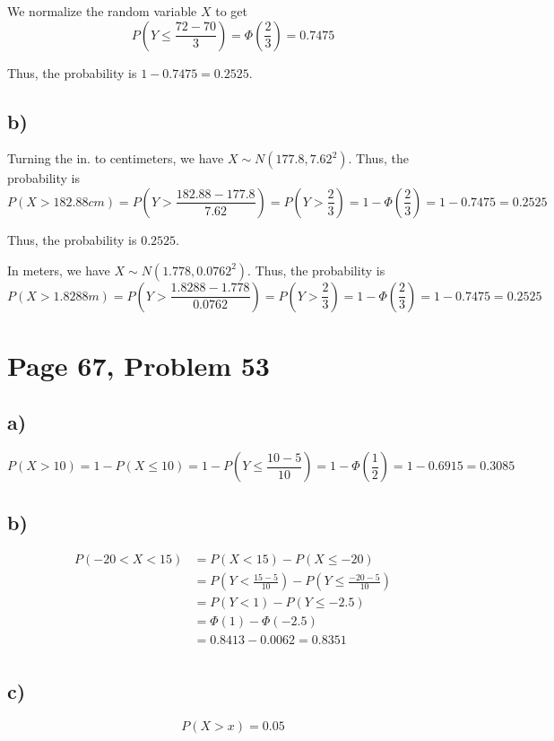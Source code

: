 \documentclass[a4paper, UTF-8]{article}
\theoremstyle{plain}
\begin{document}
We normalize the random variable $X$ to get
$$
P(Y \leq \frac{72 - 70}{3}) = \Phi(\frac{2}{3}) = 0.7475
$$

Thus, the probability is $1 - 0.7475 = 0.2525$.

\subsection{b)} 

Turning the in. to centimeters, we have $X \sim N(177.8, 7.62^2)$. Thus, the probability is 
$$
P(X > 182.88 cm) = P(Y > \frac{182.88 - 177.8}{7.62}) = P(Y > \frac{2}{3}) = 1 - \Phi(\frac{2}{3}) = 1 - 0.7475 = 0.2525
$$

Thus, the probability is $0.2525$.

In meters, we have $X \sim N(1.778, 0.0762^2)$. Thus, the probability is
$$
P(X > 1.8288 m) = P(Y > \frac{1.8288 - 1.778}{0.0762}) = P(Y > \frac{2}{3}) = 1 - \Phi(\frac{2}{3}) = 1 - 0.7475 = 0.2525
$$


\section{Page 67, Problem 53}

\subsection{a)}
$$
P(X > 10) = 1 - P(X \leq 10) = 1 - P(Y \leq \frac{10 - 5}{10}) = 1 - \Phi(\frac{1}{2}) = 1 - 0.6915 = 0.3085
$$

\subsection{b)} 

\begin{align*}
P(-20 < X < 15) &= P(X < 15) - P(X \leq -20)\\ &= P(Y < \frac{15 - 5}{10}) - P(Y \leq \frac{-20 - 5}{10})\\ &= P(Y < 1) - P(Y \leq -2.5)\\ &= \Phi(1) - \Phi(-2.5)\\ &= 0.8413 - 0.0062 = 0.8351\\
\end{align*}

\subsection{c)} 

$$
P(X > x) = 0.05
$$
\end{document}
